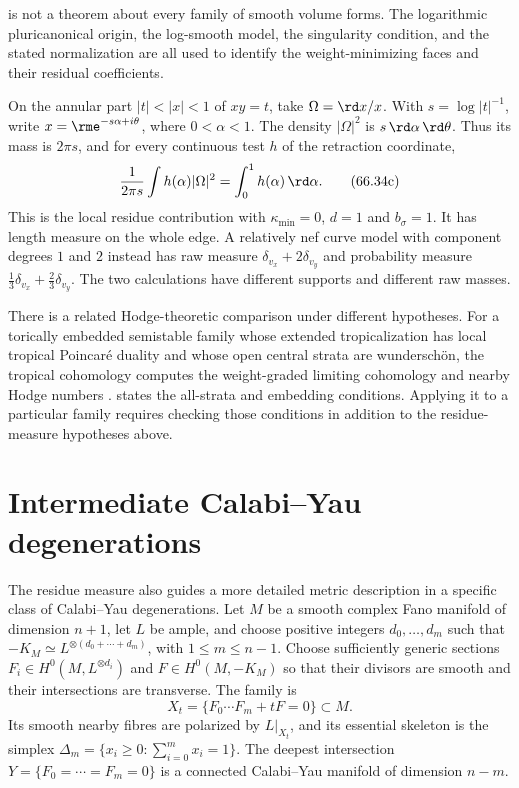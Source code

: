 \begin{remark}
\label{rem:hybrid-volume-hypotheses}
 is not a theorem about every family of smooth volume forms. The logarithmic pluricanonical origin, the log-smooth model, the singularity condition, and the stated normalization are all used to identify the weight-minimizing faces and their residual coefficients.
\end{remark}

\begin{example}
\label{ex:hybrid-nodal-curve}
On the annular part $|t|<|x|<1$ of $xy=t$, take $\Omega=\rd x/x$. With $s=\log|t|^{-1}$, write $x=\rme^{-s\alpha+i\theta}$, where $0<\alpha<1$. The density $|\Omega|^2$ is $s\,\rd\alpha\,\rd\theta$. Thus its mass is $2\pi s$, and for every continuous test $h$ of the retraction coordinate,
\[
 \frac1{2\pi s}\int h(\alpha)|\Omega|^2
       =\int_0^1 h(\alpha)\,\rd\alpha.
\tag{66.34c}\label{eq:hybrid-node-length-calculation}
\]
This is the local residue contribution with $\kappa_{\min}=0$, $d=1$ and $b_\sigma=1$. It has length measure on the whole edge. A relatively nef curve model with component degrees $1$ and $2$ instead has raw measure $\delta_{v_x}+2\delta_{v_y}$ and probability measure $\tfrac13\delta_{v_x}+\tfrac23\delta_{v_y}$. The two calculations have different supports and different raw masses.
\end{example}

There is a related Hodge-theoretic comparison under different hypotheses.
For a torically embedded semistable family whose extended tropicalization
has local tropical Poincar\'e duality and whose open central strata are
wundersch\"on, the tropical cohomology computes the weight-graded limiting
cohomology and nearby Hodge numbers
\cite[Theorem~7.1]{AAPS25Cohomologically}.
 states the all-strata and
embedding conditions. Applying it to a particular family requires checking
those conditions in addition to the residue-measure hypotheses above.

\section{Intermediate Calabi--Yau degenerations}
\label{sec:hybrid-intermediate-cy}

The residue measure also guides a more detailed metric description in a
specific class of Calabi--Yau degenerations. Let $M$ be a smooth complex
Fano manifold of dimension $n+1$, let $L$ be ample, and choose positive
integers $d_0,\ldots,d_m$ such that
$-K_M\simeq L^{\otimes(d_0+\cdots+d_m)}$, with $1\leq m\leq n-1$.
Choose sufficiently generic sections
$F_i\in H^0(M,L^{\otimes d_i})$ and $F\in H^0(M,-K_M)$ so that their
divisors are smooth and their intersections are transverse. The family is
\[
 X_t=\{F_0\cdots F_m+tF=0\}\subset M.
\tag{66.34d}\label{eq:hybrid-intermediate-family}
\]
Its smooth nearby fibres are polarized by $L|_{X_t}$, and its essential
skeleton is the simplex
$\Delta_m=\{x_i\geq0:\sum_{i=0}^m x_i=1\}$.
The deepest intersection $Y=\{F_0=\cdots=F_m=0\}$ is a connected
Calabi--Yau manifold of dimension $n-m$.


